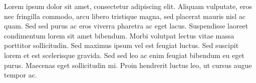 Lorem ipsum dolor sit amet, consectetur adipiscing elit. Aliquam vulputate, eros nec fringilla commodo, arcu libero tristique magna, sed placerat mauris nisl ac quam. Sed sed purus ac eros viverra pharetra ac eget lacus. Suspendisse laoreet condimentum lorem sit amet bibendum. Morbi volutpat lectus vitae massa porttitor sollicitudin. Sed maximus ipsum vel est feugiat luctus. Sed suscipit lorem et est scelerisque gravida. Sed sed leo ac enim feugiat bibendum eu eget purus. Maecenas eget sollicitudin mi. Proin hendrerit luctus leo, ut cursus augue tempor ac. 